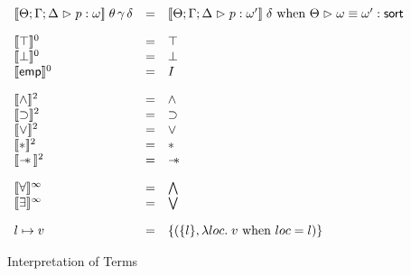 \begin{figure}
\begin{displaymath}
\begin{array}{lcl}
\interp{\judgeA{p}{\omega}}\;\theta\,\gamma\,\delta & = & 
   \interp{\judgeA{p}{\omega'}}\;\delta \mbox{ when } \judgeSortEq{\omega}{\omega'} \\[1em]

\interp{\top}^0 & = & \top \\
\interp{\bot}^0 & = & \bot \\
\interp{\emp}^0 & = & I \\[1em]

\interp{\land}^2    & = & \land \\
\interp{\implies}^2 & = & \implies \\
\interp{\vee}^2     & = & \vee \\
\interp{*}^2        & = & * \\
\interp{\wand}^2    & = & \wand \\[1em]

\interp{\forall}^\infty & = & \bigwedge \\
\interp{\exists}^\infty & = & \bigvee \\[1em]

l \pointsto v & = & \setof{(\setof{l}, \semfun{loc}{v \mbox{ when } loc = l})}
\end{array}
\end{displaymath}
\caption{ Interpretation of Terms }
\label{term-interpretation}  
\end{figure}

